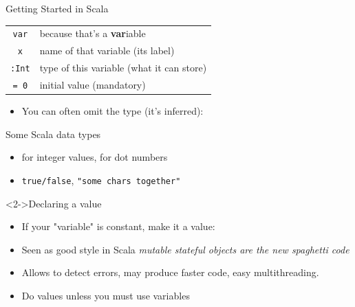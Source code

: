 \begin{frame}{Getting Started in Scala}
   {\large{} }
  \smallskip

  \begin{tabular}{c@{~$\leadsto$~}l}
    \texttt{var} & because that's a \textbf{var}iable\\
    \texttt{x}   & name of that variable (its label)\\
    \texttt{:Int}& type of this variable (what it can store)\\
    \texttt{= 0}  & initial value (mandatory)
  \end{tabular}

  \begin{itemize}
  \item You can often omit the type (it's inferred): 
  \end{itemize}

  \begin{block}{Some Scala data types}
    \begin{itemize}
    \item {} for integer values,   for dot numbers
    \item {} \texttt{true/false},  \texttt{"some chars together"}
    \end{itemize}
  \end{block}

  \begin{block}<2->{Declaring a value}
    \begin{itemize}
    \item If your "variable" is constant, make it a value:
      ~
      \smallskip
      
    \item Seen as good style in Scala \hfill%
      \textit{\small mutable stateful objects are the new spaghetti code}
    \item Allows to detect errors, may produce faster code, easy multithreading.
    \item Do values unless you must use variables
    \end{itemize}
  \end{block}

\end{frame}
